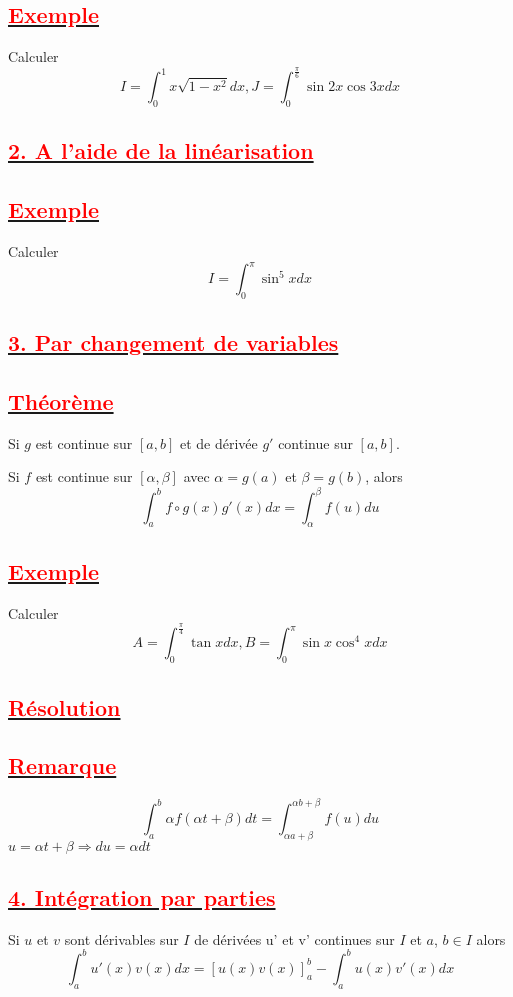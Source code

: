 \documentclass[12pt]{article}
\begin{document}
\subsection*{\underline{\textbf{\textcolor{red}{Exemple  }}}}
Calculer \[I=\int_{0}^{1}x\sqrt{1-x^{2}}dx, J=\int_{0}^{\frac{\pi}{6}}\sin 2x \cos 3x dx\]
\subsection*{\underline{\textbf{\textcolor{red}{2. A l'aide de la linéarisation }}}}
\subsection*{\underline{\textbf{\textcolor{red}{Exemple}}}}
Calculer \[I=\int_{0}^{\pi}\sin^{5} x dx \]
\subsection*{\underline{\textbf{\textcolor{red}{3. Par changement de variables}}}}
\subsection*{\underline{\textbf{\textcolor{red}{Théorème}}}}
Si $g$ est continue sur $[a,b]$ et de dérivée $g'$ continue sur $[a,b]$.

Si $f$ est continue sur $[\alpha,\beta]$ avec $\alpha = g(a)$ et $\beta=g(b)$, alors
\[ \int_{a}^{b}f\circ g(x)g'(x)dx=\int_{\alpha}^{\beta}f(u)du \]
\subsection*{\underline{\textbf{\textcolor{red}{Exemple}}}}
Calculer \[A=\int_{0}^{\frac{\pi}{4}}\tan x dx, B=\int_{0}^{\pi}\sin x \cos^{4} x dx\]
\subsection*{\underline{\textbf{\textcolor{red}{Résolution}}}}
\subsection*{\underline{\textbf{\textcolor{red}{Remarque}}}}
\[\int_{a}^{b}\alpha f(\alpha t+\beta)dt=\int_{\alpha a+\beta}^{\alpha b+\beta}f(u)du\]
$u=\alpha t +\beta \Rightarrow du=\alpha dt$
\subsection*{\underline{\textbf{\textcolor{red}{4. Intégration par parties}}}}
Si $u$ et $v$ sont dérivables sur $I$ de dérivées u' et v' continues sur $I$ et $a$, $b \in I$ alors
\[\int_{a}^{b}u'(x)v(x)dx=[u(x)v(x)]_{a}^{b}-\int_{a}^{b}u(x)v'(x)dx\]
\end{document}

